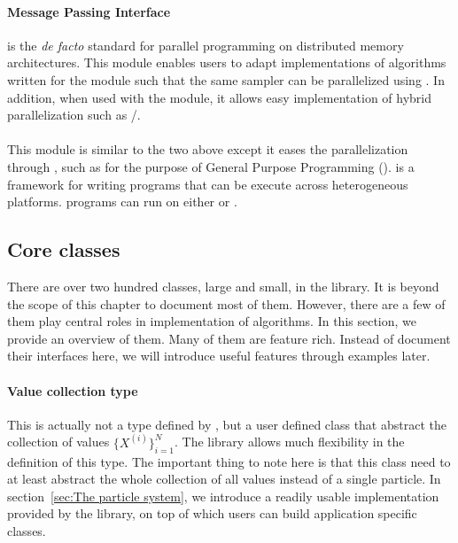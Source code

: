 \paragraph{Message Passing Interface}

\mpi is the \emph{de facto} standard for parallel programming on distributed
memory architectures. This module enables users to adapt implementations of
algorithms written for the \smp module such that the same sampler can be
parallelized using \mpi. In addition, when used with the \smp module, it
allows easy implementation of hybrid parallelization such as \mpi/\openmp.

\paragraph{\opencl}

This module is similar to the two above except it eases the parallelization
through \opencl, such as for the purpose of General Purpose \gpu Programming
(\gpgpu). \opencl is a framework for writing programs that can be execute
across heterogeneous platforms. \opencl programs can run on either \cpu or
\gpu.

\subsection{Core classes}
\label{sub:Core classes}

There are over two hundred classes, large and small, in the \vsmc library. It
is beyond the scope of this chapter to document most of them. However, there
are a few of them play central roles in implementation of \smc algorithms. In
this section, we provide an overview of them. Many of them are feature rich.
Instead of document their interfaces here, we will introduce useful features
through examples later.

\paragraph{Value collection type}

This is actually not a type defined by \vsmc, but a user defined class that
abstract the collection of values $\{X^{(i)}\}_{i=1}^N$. The library allows
much flexibility in the definition of this type. The important thing to note
here is that this class need to at least abstract the whole collection of all
values instead of a single particle. In section~\ref{sec:The particle system},
we introduce a readily usable implementation provided by the \vsmc library, on
top of which users can build application specific classes.

